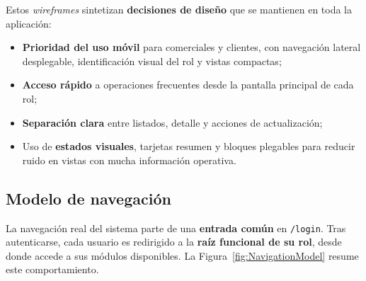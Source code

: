 Estos \textit{wireframes} sintetizan \textbf{decisiones de diseño} que se mantienen en toda la aplicación:

\begin{itemize}
    \item \textbf{Prioridad del uso móvil} para comerciales y clientes, con navegación lateral desplegable, identificación visual del rol y vistas compactas;
    \item \textbf{Acceso rápido} a operaciones frecuentes desde la pantalla principal de cada rol;
    \item \textbf{Separación clara} entre listados, detalle y acciones de actualización;
    \item Uso de \textbf{estados visuales}, tarjetas resumen y bloques plegables para reducir ruido en vistas con mucha información operativa.
\end{itemize}

\subsection{Modelo de navegación}

La navegación real del sistema parte de una \textbf{entrada común} en \texttt{/login}. Tras autenticarse, cada usuario es redirigido a la \textbf{raíz funcional de su rol}, desde donde accede a sus módulos disponibles. La Figura~\ref{fig:NavigationModel} resume este comportamiento.

